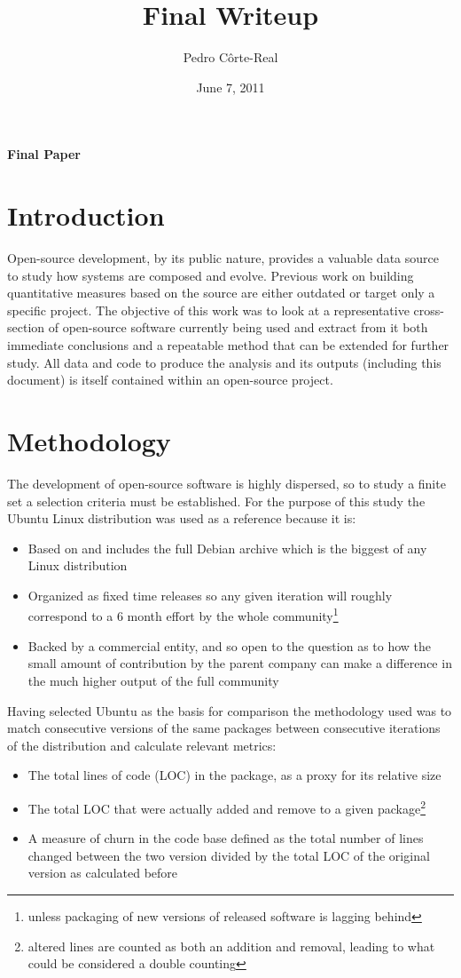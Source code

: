 \documentclass[11pt]{article}
\title{Final Writeup}
\date{June 7, 2011}
\author{Pedro Côrte-Real}
\begin{document}
\thispagestyle{fancy}
\begin{center}
  \textbf{\Large Final Paper}
\end{center}

\section{Introduction}

Open-source development, by its public nature, provides a valuable data source to study how systems are composed and evolve. Previous work on building quantitative measures based on the source are either outdated\cite{sloccount} or target only a specific project\cite{lwnstats,gnomecensus}. The objective of this work was to look at a representative cross-section of open-source software currently being used and extract from it both immediate conclusions and a repeatable method that can be extended for further study. All data and code to produce the analysis and its outputs (including this document) is itself contained within an open-source project\cite{repo}.

\section{Methodology}

The development of open-source software is highly dispersed, so to study a finite set a selection criteria must be established. For the purpose of this study the Ubuntu Linux distribution was used as a reference because it is:
\begin{itemize}
\item Based on and includes the full Debian archive which is the biggest of any Linux distribution
\item Organized as fixed time releases\cite{ubuntureleases} so any given iteration will roughly correspond to a 6 month effort by the whole community\footnote{unless packaging of new versions of released software is lagging behind}
\item Backed by a commercial entity, and so open to the question as to how the small amount of contribution by the parent company can make a difference in the much higher output of the full community
\end{itemize}

Having selected Ubuntu as the basis for comparison the methodology used was to match consecutive versions of the same packages between consecutive iterations of the distribution and calculate relevant metrics:
\begin{itemize}
\item The total lines of code (LOC) in the package, as a proxy for its relative size
\item The total LOC that were actually added and remove to a given package\footnote{altered lines are counted as both an addition and removal, leading to what could be considered a double counting}
\item A measure of churn in the code base defined as the total number of lines changed between the two version divided by the total LOC of the original version as calculated before
\end{itemize}
\end{document}
